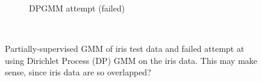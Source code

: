 \documentclass{article}
\begin{document}
\begin{figure}
\begin{subfigure}[h]{0.5\textwidth}
                    \caption{DPGMM attempt (failed)}
                    \label{fig:GMMfail}
            \end{subfigure}
            ~ %
            \caption{Partially-supervised GMM of iris test data and failed attempt at using Dirichlet Process (DP) GMM on the iris data.  This may make sense, since iris data are so overlapped?}\label{fig:GMM}
    \end{figure}
\end{document}
